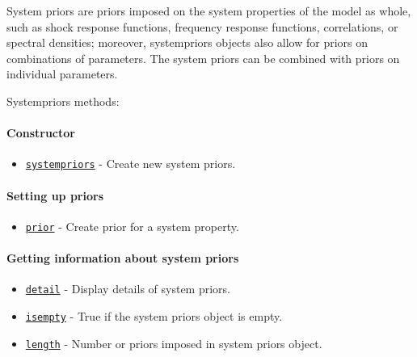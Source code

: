 

	System priors are priors imposed on the system properties of the model
as whole, such as shock response functions, frequency response
functions, correlations, or spectral densities; moreover, systempriors
objects also allow for priors on combinations of parameters. The system
priors can be combined with priors on individual parameters.

Systempriors methods:

\paragraph{Constructor}\label{constructor}

\begin{itemize}
\itemsep1pt\parskip0pt
\item
  \href{systempriors/systempriors}{\texttt{systempriors}} - Create new
  system priors.
\end{itemize}

\paragraph{Setting up priors}\label{setting-up-priors}

\begin{itemize}
\itemsep1pt\parskip0pt
\item
  \href{systempriors/prior}{\texttt{prior}} - Create prior for a system
  property.
\end{itemize}

\paragraph{Getting information about system
priors}\label{getting-information-about-system-priors}

\begin{itemize}
\itemsep1pt\parskip0pt
\item
  \href{systempriors/detail}{\texttt{detail}} - Display details of
  system priors.
\item
  \href{systempriors/isempty}{\texttt{isempty}} - True if the system
  priors object is empty.
\item
  \href{systempriors/length}{\texttt{length}} - Number or priors imposed
  in system priors object.
\end{itemize}



